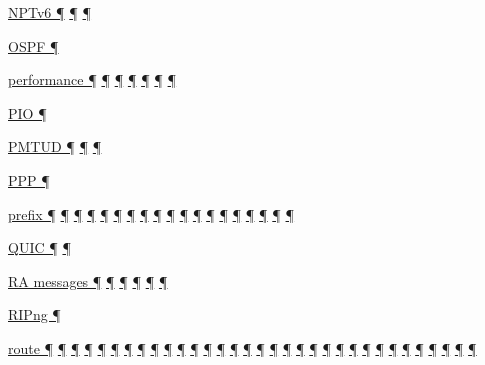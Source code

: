 \documentclass[
]{article}
\begin{document}
\hyperref[translation-and-ipv4-as-a-service]{NPTv6 ¶}
\hyperref[security]{¶} \hyperref[multihoming]{¶}

\hyperref[routing]{OSPF ¶}

\hyperref[dual-stack-scenarios]{performance ¶}
\hyperref[ipv6-primary-differences-from-ipv4]{¶} \hyperref[filtering]{¶}
\hyperref[network-design]{¶} \hyperref[management-and-operations]{¶}
\hyperref[multihoming]{¶} \hyperref[packet-size-and-jumbo-frames]{¶}

\hyperref[auto-configuration]{PIO ¶}

\hyperref[extension-headers-and-options]{PMTUD ¶}
\hyperref[filtering]{¶} \hyperref[packet-size-and-jumbo-frames]{¶}

\hyperref[layer-2-functions]{PPP ¶}

\hyperref[addresses]{prefix ¶} \hyperref[auto-configuration]{¶}
\hyperref[managed-configuration]{¶} \hyperref[routing]{¶}
\hyperref[source-and-destination-address-selection]{¶}
\hyperref[dual-stack-scenarios]{¶}
\hyperref[ipv6-primary-differences-from-ipv4]{¶}
\hyperref[translation-and-ipv4-as-a-service]{¶} \hyperref[tunnels]{¶}
\hyperref[security]{¶} \hyperref[filtering]{¶}
\hyperref[layer-2-considerations]{¶} \hyperref[topology-obfuscation]{¶}
\hyperref[network-design]{¶} \hyperref[address-planning]{¶}
\hyperref[prefix-per-host]{¶}
\hyperref[address-and-prefix-management]{¶}
\hyperref[multi-prefix-operation]{¶} \hyperref[multihoming]{¶}

\hyperref[transport-protocols]{QUIC ¶} \hyperref[multihoming]{¶}

\hyperref[address-resolution]{RA messages ¶}
\hyperref[auto-configuration]{¶} \hyperref[managed-configuration]{¶}
\hyperref[routing]{¶} \hyperref[prefix-per-host]{¶}
\hyperref[multi-prefix-operation]{¶}

\hyperref[routing]{RIPng ¶}

\hyperref[why-version-6]{route ¶} \hyperref[ipv6-basic-technology]{¶}
\hyperref[address-resolution]{¶} \hyperref[addresses]{¶}
\hyperref[auto-configuration]{¶} \hyperref[dns]{¶}
\hyperref[extension-headers-and-options]{¶}
\hyperref[layer-2-functions]{¶} \hyperref[managed-configuration]{¶}
\hyperref[packet-format]{¶} \hyperref[routing]{¶}
\hyperref[traffic-class-and-flow-label]{¶} \hyperref[further-reading]{¶}
\hyperref[coexistence-with-legacy-ipv4]{¶}
\hyperref[dual-stack-scenarios]{¶}
\hyperref[ipv6-primary-differences-from-ipv4]{¶}
\hyperref[translation-and-ipv4-as-a-service]{¶} \hyperref[tunnels]{¶}
\hyperref[filtering]{¶} \hyperref[layer-2-considerations]{¶}
\hyperref[topology-obfuscation]{¶} \hyperref[network-design]{¶}
\hyperref[address-planning]{¶} \hyperref[management-and-operations]{¶}
\hyperref[address-and-prefix-management]{¶}
\hyperref[energy-consumption]{¶} \hyperref[multi-prefix-operation]{¶}
\hyperref[multihoming]{¶} \hyperref[packet-size-and-jumbo-frames]{¶}
\hyperref[routing-operation]{¶} \hyperref[deployment-by-carriers]{¶}
\hyperref[deployment-in-the-enterprise]{¶}
\hyperref[deployment-in-the-home]{¶}
\end{document}
